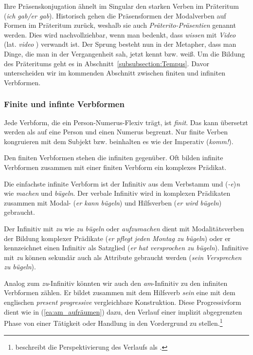 Ihre Präsenskonjugation ähnelt im Singular den starken Verben im Präteritum (\textit{ich gab/er gab}). Historisch gehen die Präsensformen der Modalverben auf Formen im Präteritum zurück, weshalb sie auch \textit{Präterito-Präsentien} genannt werden. Dies wird nachvollziehbar, wenn man bedenkt, dass \textit{wissen} mit \textit{Video} (lat. \textit{video} ) verwandt ist. Der Sprung besteht nun in der Metapher, dass man Dinge, die man in der Vergangenheit sah, jetzt kennt bzw. weiß. Um die Bildung des Präteritums geht es in Abschnitt~\ref{subsubsection:Tempus}. Davor unterscheiden wir im kommenden Abschnitt zwischen finiten und infiniten Verbformen. 


\subsubsection{Finite und infinte Verbformen}\label{subsubsection:finit_infinit}

Jede Verbform, die ein Person-Numerus-Flexiv trägt, ist \textit{finit}. Das kann übersetzt werden als auf eine Person und einen Numerus begrenzt. Nur finite Verben kongruieren mit dem Subjekt bzw. beinhalten es wie der Imperativ (\textit{komm!}).
 
Den finiten Verbformen stehen die infiniten gegenüber. Oft bilden infinite Verbformen zusammen mit einer finiten Verbform ein komplexes Prädikat.   

Die einfachste infinite Verbform ist der Infinitiv aus dem Verbstamm und (\textit{-e})\textit{n} wie \textit{machen} und \textit{bügeln}. Der verbale Infinitiv wird in komplexen Prädikaten zusammen mit Modal- (\textit{er kann bügeln}) und Hilfsverben (\textit{er wird bügeln}) gebraucht.

Der Infinitiv mit \textit{zu} wie \textit{zu bügeln} oder \textit{aufzumachen} dient mit Modalitätsverben der Bildung komplexer Prädikate (\textit{er pflegt jeden Montag zu bügeln}) oder er kennzeichnet einen Infinitiv als Satzglied (\textit{er hat versprochen zu bügeln}). Infinitive mit \textit{zu} können sekundär auch als Attribute gebraucht werden (\textit{sein Versprechen zu bügeln}).

Analog zum \textit{zu}-Infinitiv könnten wir auch den \textit{am}-Infinitiv zu den infiniten Verbformen zählen. Er bildet zusammen mit dem Hilfsverb \textit{sein} eine mit dem englischen \textit{present progressive} vergleichbare Konstruktion. Diese Progressivform dient wie in (\ref{ea:am_aufräumen}) dazu, den Verlauf einer implizit abgegrenzten Phase von einer Tätigkeit oder Handlung in den Vordergrund zu stellen.\footnote{\citet[20]{Krause2002} beschreibt die Perspektivierung des Verlaufs als .}


